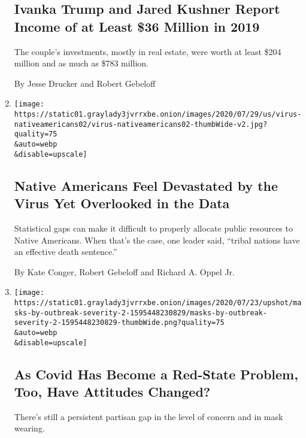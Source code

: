 \begin{enumerate}
{  \subsection{Ivanka Trump and Jared Kushner Report Income of at Least
  \$36 Million in
  2019}\label{ivanka-trump-and-jared-kushner-report-income-of-at-least-36-million-in-2019}}

  The couple's investments, mostly in real estate, were worth at least
  \$204 million and as much as \$783 million.

  By Jesse Drucker and Robert Gebeloff
\item
  \href{/2020/07/30/us/native-americans-coronavirus-data.html}{}

  \texttt{[image: https://static01.graylady3jvrrxbe.onion/images/2020/07/29/us/virus-nativeamericans02/virus-nativeamericans02-thumbWide-v2.jpg?quality=75\\\&auto=webp\\\&disable=upscale]}

  \hypertarget{native-americans-feel-devastated-by-the-virus-yet-overlooked-in-the-data}{%
  \subsection{Native Americans Feel Devastated by the Virus Yet
  Overlooked in the
  Data}\label{native-americans-feel-devastated-by-the-virus-yet-overlooked-in-the-data}}

  Statistical gaps can make it difficult to properly allocate public
  resources to Native Americans. When that's the case, one leader said,
  ``tribal nations have an effective death sentence.''

  By Kate Conger, Robert Gebeloff and Richard A. Oppel Jr.
\item
  \href{/2020/07/30/upshot/coronavirus-republican-voting.html}{}

  \texttt{[image: https://static01.graylady3jvrrxbe.onion/images/2020/07/23/upshot/masks-by-outbreak-severity-2-1595448230829/masks-by-outbreak-severity-2-1595448230829-thumbWide.png?quality=75\\\&auto=webp\\\&disable=upscale]}

  \hypertarget{as-covid-has-become-a-red-state-problem-too-have-attitudes-changed}{%
  \subsection{As Covid Has Become a Red-State Problem, Too, Have
  Attitudes
  Changed?}\label{as-covid-has-become-a-red-state-problem-too-have-attitudes-changed}}

  There's still a persistent partisan gap in the level of concern and in
  mask wearing.


\end{enumerate}
